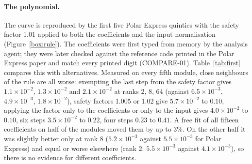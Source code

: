 \documentclass[11pt]{article}
\begin{document}
\paragraph{The polynomial.} The curve is reproduced by the first five Polar Express quintics with the
safety factor 1.01 applied to both the coefficients and the input normalisation
(Figure~\ref{box:rule}). The coefficients were first typed from memory by the analysis agent; they
were later checked against the reference code printed in the Polar Express paper and match every
printed digit (COMPARE-01). Table~\ref{tab:first} compares this with alternatives. Measured on every
fifth module, close neighbours of the rule are all worse: exempting the last step from the safety
factor gives $1.1\times10^{-2}$, $1.3\times10^{-2}$ and $2.1\times10^{-2}$ at ranks 2, 8, 64 (against
$6.5\times10^{-3}$, $4.9\times10^{-3}$, $1.8\times10^{-2}$), safety factors 1.005 or 1.02 give
$5.7\times10^{-2}$ to $0.10$, applying the factor only to the coefficients or only to the input gives
$4.0\times10^{-2}$ to $0.10$, six steps $3.5\times10^{-2}$ to $0.22$, four steps $0.23$ to $0.41$.
A free fit of all fifteen coefficients on half of the modules moved them by up to 3\%. On the
other half it was slightly better only at rank 8 ($5.2\times10^{-3}$ against $5.5\times10^{-3}$ for
Polar Express) and equal or worse elsewhere (rank 2: $5.5\times10^{-3}$ against $4.1\times10^{-3}$), so
there is no evidence for different coefficients.
\end{document}
